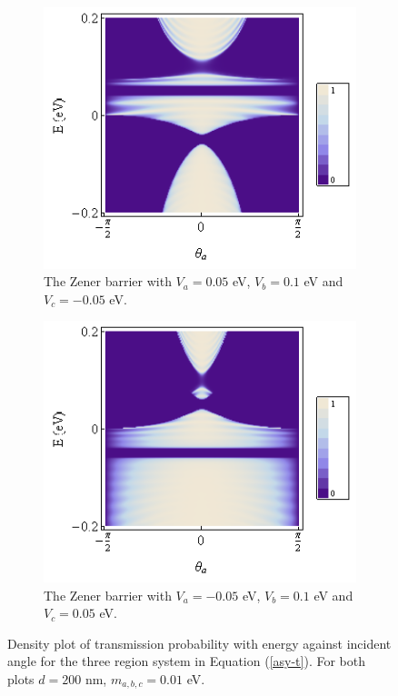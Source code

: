 		\begin{figure}[h]
			 \begin{subfigure}[h]{0.5\textwidth}
				\centerline{\includegraphics[scale=0.5]{images/asy-3}}
				\caption{The Zener barrier with $V_{a}=0.05$ eV, $V_{b}=0.1$ eV and $V_{c}=-0.05$ eV.}
			\end{subfigure}
			\hspace{0.5cm}
			\begin{subfigure}[h]{0.5\textwidth}
				\centerline{\includegraphics[scale=0.5]{images/asy-4}}
				\caption{The Zener barrier with $V_{a}=-0.05$ eV, $V_{b}=0.1$ eV and $V_{c}=0.05$ eV.}
			\end{subfigure}
			\caption{Density plot of transmission probability with energy against incident angle for the three region system in Equation (\ref{asy-t}). For both plots $d=200$ nm, $m_{a,b,c}=0.01$ eV.}
			\label{asy-3}
		\end{figure}
